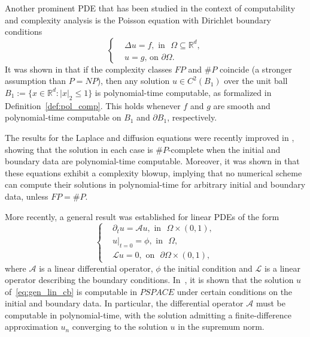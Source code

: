\documentclass[pdflatex]{sn-jnl}%
\begin{document}
Another prominent PDE that has been studied in the context of computability and complexity analysis is the Poisson equation with Dirichlet boundary conditions 
\begin{equation}
    \left\{\begin{aligned}
        &\Delta u = f,\textrm{ in }\,\,    
        \Omega\subseteq\mathbb{R}^d,\\&
        u = g\textrm{, on}\,\,\partial\Omega.
    \end{aligned}\right.
\end{equation}
It was shown in \cite{Kawamura2017-dv} that if the complexity classes $FP$ and $\#P$ coincide (a stronger assumption than $P = NP$), then any solution $u \in C^2(B_1)$ over the unit ball $B_1 := \{ x \in \mathbb{R}^d : |x|_2 \leq 1\}$ is polynomial-time computable, as formalized in Definition~\ref{def:pol_comp}. This holds whenever $f$ and $g$ are smooth and polynomial-time computable on $B_1$ and $\partial B_1$, respectively.

The results for the Laplace and diffusion equations were recently improved in \cite{bacho2023complexityblowupsolutionslaplace}, showing that the solution in each case is $\#P$-complete when the initial and boundary data are polynomial-time computable. Moreover, it was shown in \cite{bacho2023complexityblowupsolutionslaplace} that these equations exhibit a complexity blowup, implying that no numerical scheme can compute their solutions in polynomial-time for arbitrary initial and boundary data, unless $FP = \#P$.

More recently, a general result was established for linear PDEs of the form
\begin{equation} \label{eq:gen_lin_cb}   
\left\{
\begin{aligned}
    &\partial_t u = \mathcal{A}u, \textrm{ in }\,\,\Omega\times(0,1),\\&
    u|_{t=0} = \phi,\textrm{ in }\,\,\Omega,\\&
    \mathcal{L}u = 0, \textrm{ on }\,\,\partial\Omega\times(0,1),
\end{aligned} \right.
\end{equation}
where $\mathcal{A}$ is a linear differential operator, $\phi$ the initial condition and $\mathcal{L}$ is a linear operator describing the boundary conditions. In~\cite{Koswara2021-sr}, it is shown that the solution $u$ of~\eqref{eq:gen_lin_cb} is computable in $PSPACE$ \cite{Arora2012-bh} under certain conditions on the initial and boundary data. In particular, the differential operator $\mathcal{A}$ must be computable in polynomial-time, with the solution admitting a finite-difference approximation $u_n$ converging to the solution $u$ in the supremum norm.
 
\end{document}
